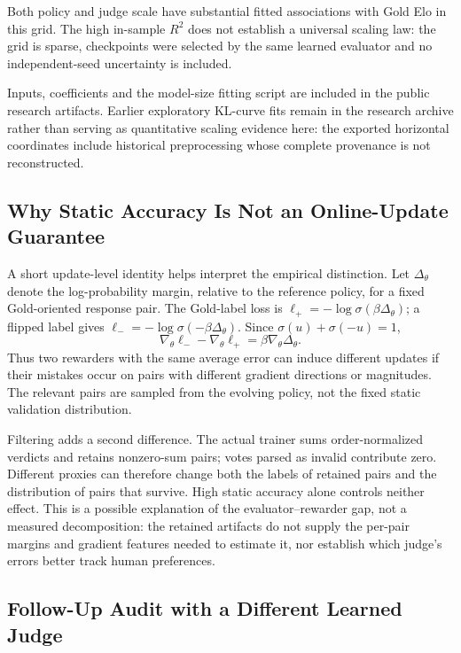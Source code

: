 \documentclass[11pt,letterpaper]{article}
\begin{document}
Both policy and judge scale have substantial fitted associations with Gold Elo in this grid. The high in-sample $R^2$ does not establish a universal scaling law: the grid is sparse, checkpoints were selected by the same learned evaluator and no independent-seed uncertainty is included.

Inputs, coefficients and the model-size fitting script are included in the public research artifacts. Earlier exploratory KL-curve fits remain in the research archive rather than serving as quantitative scaling evidence here: the exported horizontal coordinates include historical preprocessing whose complete provenance is not reconstructed.

\subsection{Why Static Accuracy Is Not an Online-Update Guarantee}
\label{app:dpo-noise}

A short update-level identity helps interpret the empirical distinction. Let $\Delta_\theta$ denote the log-probability margin, relative to the reference policy, for a fixed Gold-oriented response pair. The Gold-label loss is $\ell_+=-\log\sigma(\beta\Delta_\theta)$; a flipped label gives $\ell_-=-\log\sigma(-\beta\Delta_\theta)$. Since $\sigma(u)+\sigma(-u)=1$,
\[
\nabla_\theta\ell_- - \nabla_\theta\ell_+
=\beta\nabla_\theta\Delta_\theta.
\]
Thus two rewarders with the same average error can induce different updates if their mistakes occur on pairs with different gradient directions or magnitudes. The relevant pairs are sampled from the evolving policy, not the fixed static validation distribution.

Filtering adds a second difference. The actual trainer sums order-normalized verdicts and retains nonzero-sum pairs; votes parsed as invalid contribute zero. Different proxies can therefore change both the labels of retained pairs and the distribution of pairs that survive. High static accuracy alone controls neither effect. This is a possible explanation of the evaluator--rewarder gap, not a measured decomposition: the retained artifacts do not supply the per-pair margins and gradient features needed to estimate it, nor establish which judge's errors better track human preferences.

\subsection{Follow-Up Audit with a Different Learned Judge}
\label{app:independent-judge}
\end{document}

